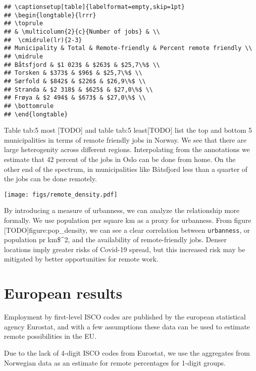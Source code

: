 \documentclass[11pt,]{article}
\begin{document}
\begin{verbatim}
## \captionsetup[table]{labelformat=empty,skip=1pt}
## \begin{longtable}{lrrr}
## \toprule
## & \multicolumn{2}{c}{Number of jobs} & \\ 
##  \cmidrule(lr){2-3}
## Municipality & Total & Remote-friendly & Percent remote friendly \\ 
## \midrule
## Båtsfjord & $1 023$ & $263$ & $25,7\%$ \\ 
## Torsken & $373$ & $96$ & $25,7\%$ \\ 
## Sørfold & $842$ & $226$ & $26,9\%$ \\ 
## Stranda & $2 318$ & $625$ & $27,0\%$ \\ 
## Frøya & $2 494$ & $673$ & $27,0\%$ \\ 
## \bottomrule
## \end{longtable}
\end{verbatim}

Table tab:5 most {[}TODO{]} and table tab:5 least{[}TODO{]} list the top
and bottom 5 municipalities in terms of remote friendly jobs in Norway.
We see that there are large heterogenity across different regions.
Interpolating from the annotations we estimate that 42 percent of the
jobs in Oslo can be done from home. On the other end of the spectrum, in
municipalities like Båtsfjord less than a quarter of the jobs can be
done remotely.

\texttt{[image: figs/remote\_density.pdf]}

By introducing a measure of urbanness, we can analyze the relationship
more formally. We use population per square km as a proxy for urbanness.
From figure {[}TODO{]}figure:pop\_density, we can see a clear
correlation between \texttt{urbanness}, or population pr km\$\^{}2, and
the availability of remote-friendly jobs. Denser locations imply greater
risks of Covid-19 spread, but this increased risk may be mitigated by
better opportunities for remote work.

\hypertarget{european-results}{%
\section{European results}\label{european-results}}

Employment by first-level ISCO codes are published by the european
statistical agency Eurostat, and with a few assumptions these data can
be used to estimate remote possibilities in the EU.

Due to the lack of 4-digit ISCO codes from Eurostat, we use the
aggregates from Norwegian data as an estimate for remote percentages for
1-digit groups.
\end{document}
